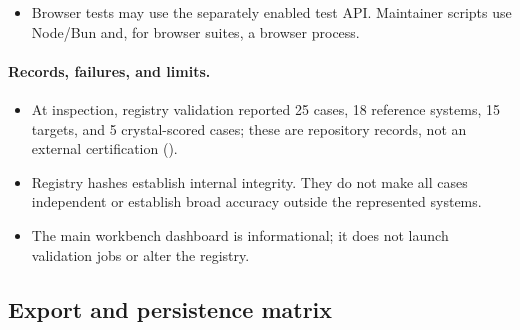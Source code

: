 \documentclass[11pt]{article}
\begin{document}
\begin{small}
\begin{itemize}[leftmargin=*]
\item Browser tests may use the separately enabled test API. Maintainer scripts use Node/Bun and, for browser suites, a browser process.

\end{itemize}

\paragraph{Records, failures, and limits.}

\begin{itemize}[leftmargin=*]

\item At inspection, registry validation reported 25 cases, 18 reference systems, 15 targets, and 5 crystal-scored cases; these are repository records, not an external certification ().

\item Registry hashes establish internal integrity. They do not make all cases independent or establish broad accuracy outside the represented systems.

\item The main workbench dashboard is informational; it does not launch validation jobs or alter the registry.

\end{itemize}

\subsection{Export and persistence matrix}\label{appB:sec22}


\end{small}
\end{document}
